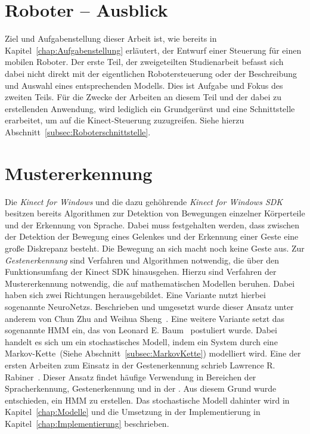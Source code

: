 \section {Roboter -- Ausblick}
Ziel und Aufgabenstellung dieser Arbeit ist, wie bereits in Kapitel~\ref{chap:Aufgabenstellung} erl\"autert, der Entwurf einer Steuerung f\"ur einen mobilen Roboter.
Der erste Teil, der zweigeteilten Studienarbeit befasst sich dabei nicht direkt mit der eigentlichen Robotersteuerung oder der Beschreibung und Auswahl eines entsprechenden Modells.
Dies ist Aufgabe und Fokus des zweiten Teils.
\newline
F\"ur die Zwecke der Arbeiten an diesem Teil und der dabei zu erstellenden Anwendung, wird lediglich ein Grundger\"urst und eine Schnittstelle erarbeitet, um auf die Kinect-Steuerung zuzugreifen.
Siehe hierzu Abschnitt~\ref{subsec:Roboterschnittstelle}.
\section{Mustererkennung}
Die \textit{Kinect for Windows} und die dazu geh\"ohrende \textit{Kinect for Windows SDK} besitzen bereits Algorithmen zur Detektion von Bewegungen einzelner K\"orperteile und der Erkennung von Sprache.
Dabei muss festgehalten werden, dass zwischen der Detektion der Bewegung eines Gelenkes und der Erkennung einer Geste eine gro\ss e Diskrepanz besteht. Die Bewegung an sich macht noch keine Geste aus.
Zur \textit{Gestenerkennung} sind Verfahren und Algorithmen notwendig, die \"uber den Funktionsumfang der Kinect \acrshort{SDK} hinausgehen.
\newline
Hierzu sind Verfahren der Mustererkennung notwendig, die auf mathematischen Modellen beruhen. Dabei haben sich zwei Richtungen herausgebildet.
Eine Variante nutzt hierbei sogenannte \glspl{NeuroNetz}. Beschrieben und umgesetzt wurde dieser Ansatz unter anderem von Chun Zhu and Weihua Sheng~\cite{bib:neuralnetwork}.
\newline
Eine weitere Variante setzt das sogenannte \gls{HMM} ein, das von Leonard E. Baum~\cite{bib:hmmbaum} postuliert wurde. Dabei handelt es sich um ein stochastisches Modell, indem ein System durch eine Markov-Kette~(Siehe Abschnitt~\ref{subsec:MarkovKette}) modelliert wird. Eine der ersten Arbeiten zum Einsatz in der Gestenerkennung schrieb Lawrence R. Rabiner~\cite{bib:hmmrabiner}.
Dieser Ansatz findet h\"aufige Verwendung in Bereichen der Spracherkennung, Gestenerkennung und in der . Aus diesem Grund wurde entschieden, ein \gls{HMM} zu erstellen.
Das stochastische Modell dahinter wird in Kapitel~\ref{chap:Modelle} und die Umsetzung in der Implementierung in Kapitel~\ref{chap:Implementierung} beschrieben.